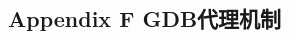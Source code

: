 \documentclass[class=book, crop=false]{standalone}
\begin{document}
\begin{CJK}{UTF8}{gbsn}

\chapter*{Appendix F GDB代理机制}













\cleardoublepage

\end{CJK}
\end{document}
